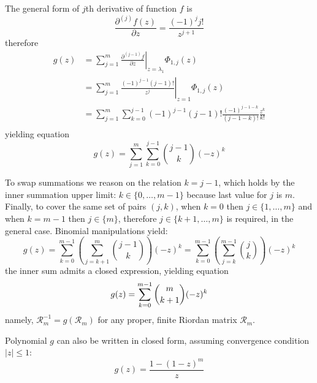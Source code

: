 The general form of $j$th derivative of function $f$ is 
$$\frac{\partial^{(j)}{f}(z)}{\partial{z}} = \frac{(-1)^{j}j!}{z^{j+1}}$$ 
therefore
\begin{displaymath}
\begin{split}
  g(z) &= \sum_{j=1}^{m}{ \left. \frac{\partial^{(j-1)}{f}}{\partial{z}} \right|_{z=\lambda_{1}}\Phi_{1,j}(z)} \\
       &= \sum_{j=1}^{m}{ \left. \frac{(-1)^{j-1}(j-1)!}{z^{j}} \right|_{z=1}\Phi_{1,j}(z)} \\
       &= \sum_{j=1}^{m}{\sum_{k=0}^{j-1}{(-1)^{j-1}(j-1)!\frac{(-1)^{j-1-k}}{(j-1-k)!}\frac{z^{k}}{k!}}} \\
\end{split}
\end{displaymath}
yielding equation
\begin{equation}
  g(z) = \sum_{j=1}^{m}{\sum_{k=0}^{j-1}{{{j-1}\choose{k}}(-z)^{k}}} 
\end{equation}

To swap summations we reason on the relation $k=j-1$, which holds by the inner summation upper limit:
$k\in \lbrace 0,\ldots,m-1 \rbrace$ because last value for $j$ is $m$. Finally, to cover the same set 
of pairs $(j, k)$, when $k=0$ then $j\in \lbrace 1,\ldots,m \rbrace$ and when $k=m-1$ then 
$j\in \lbrace m \rbrace$, therefore $j\in \lbrace k+1, \ldots, m \rbrace$ is required, in the general case.
Binomial manipulations yield:
\begin{displaymath}
  g(z) = \sum_{k=0}^{m-1}{\left(\sum_{j=k+1}^{m}{{{j-1}\choose{k}}}\right)(-z)^{k}}
       = \sum_{k=0}^{m-1}{\left(\sum_{j=k}^{m-1}{{{j}\choose{k}}}\right)(-z)^{k}}
\end{displaymath}
the inner sum admits a closed expression, yielding equation
\begin{equation}
  g(z) = \sum_{k=0}^{m-1}{{{m}\choose{k+1}}(-z)^{k}} \\
\end{equation}
namely, $\mathcal{R}_{m}^{-1}=g(\mathcal{R}_{m})$ for any proper, finite Riordan matrix $\mathcal{R}_{m}$.

Polynomial $g$ can also be written in closed form, assuming convergence condition $|z|\leq 1$:
\begin{displaymath}
g(z) = \frac{1- \left(1- z \right)^{m} }{z}
\end{displaymath}

